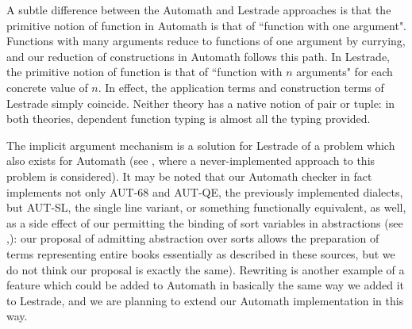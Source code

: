 \documentclass[submission,copyright,creativecommons]{eptcs}
\begin{document}
A subtle difference between the Automath and Lestrade approaches is that the primitive notion of function in Automath is that of ``function with one argument".  Functions with many arguments reduce to functions of one argument by currying, and our reduction of constructions in Automath follows this path.  In Lestrade, the primitive notion of function is that of ``function with $n$ arguments" for each concrete value of $n$.  In effect, the application terms and construction terms of Lestrade simply coincide.  Neither theory has a native notion
of pair or tuple:  in both theories, dependent function typing is almost all the typing provided.

The implicit argument mechanism is a solution for Lestrade of a problem which also exists for Automath (see \cite{autsynt}, where a never-implemented approach to this problem is considered).  It may be noted that our Automath checker in fact implements not only AUT-68 and AUT-QE, the previously implemented dialects, but AUT-SL, the single line variant, or something functionally equivalent, as well, as a side effect of our permitting the binding of sort variables in abstractions (see \cite{autsl},\cite{autlambda}):   our proposal of admitting abstraction over sorts allows the preparation of terms representing entire books essentially as described in these sources, but we do not think our proposal is exactly the same).  Rewriting is another example of a feature which could be added to Automath in basically the same way we added it to Lestrade, and we are planning to extend our Automath implementation in this way.
\end{document}

